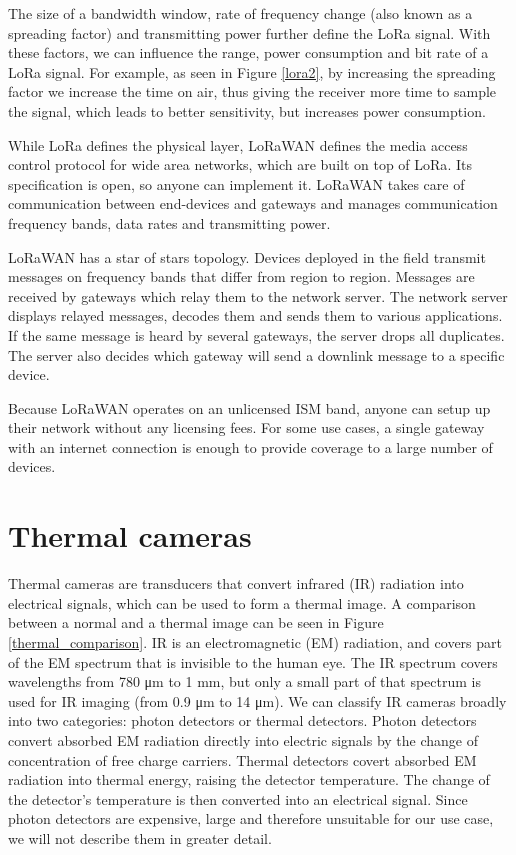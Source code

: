 The size of a bandwidth window, rate of frequency change (also known as a spreading factor) and transmitting power further define the LoRa signal.
With these factors, we can influence the range, power consumption and bit rate of a LoRa signal.
For example, as seen in Figure \ref{lora2}, by increasing the spreading factor we increase the time on air, thus giving the receiver more time to sample the signal, which leads to better sensitivity, but increases power consumption.

While LoRa defines the physical layer, LoRaWAN defines the media access control protocol for wide area networks, which are built on top of LoRa\cite{lora_article}.
Its specification is open, so anyone can implement it.
LoRaWAN takes care of communication between end-devices and gateways and manages communication frequency bands, data rates and transmitting power.

LoRaWAN has a star of stars topology\cite{lora_article}.
Devices deployed in the field transmit messages on frequency bands that differ from region to region. 
Messages are received by gateways which relay them to the network server.
The network server displays relayed messages, decodes them and sends them to various applications.
If the same message is heard by several gateways, the server drops all duplicates.
The server also decides which gateway will send a downlink message to a specific device. 

Because LoRaWAN operates on an unlicensed ISM band, anyone can setup up their network without any licensing fees.
For some use cases, a single gateway with an internet connection is enough to provide coverage to a large number of devices.


\section{ Thermal cameras} \label{thermal_cameras}

Thermal cameras are transducers that convert infrared (IR) radiation into electrical signals, which can be used to form a thermal image.
A comparison between a normal and a thermal image can be seen in Figure \ref{thermal_comparison}.
IR is an electromagnetic (EM) radiation, and covers part of the EM spectrum that is invisible to the human eye.
The IR spectrum covers wavelengths from 780 \si{\micro\meter} to 1 \si{\milli\meter}, but only a small part of that spectrum is used for IR imaging (from 0.9 \si{\micro\meter} to 14 \si{\micro\meter})\cite{thermal_book}.
We can classify IR cameras broadly into two categories: photon detectors or thermal detectors\cite{thermal_book}.
Photon detectors convert absorbed EM radiation directly into electric signals by the change of concentration of free charge carriers\cite{thermal_book}.
Thermal detectors covert absorbed EM radiation into thermal energy, raising the detector temperature\cite{thermal_book}. 
The change of the detector's temperature is then converted into an electrical signal.
Since photon detectors are expensive, large and therefore unsuitable for our use case, we will not describe them in greater detail.
\newline 

